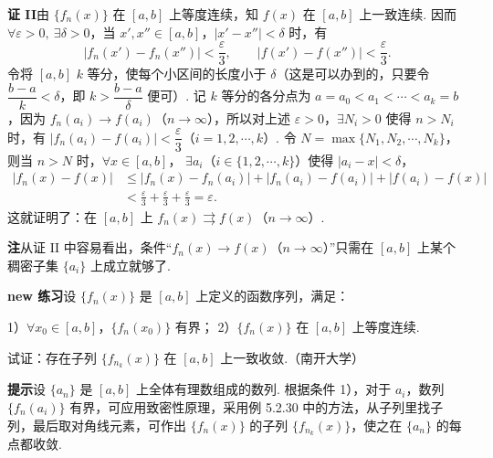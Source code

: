 \documentclass[UTF8, 12pt, fontset=fandol, oneside]{ctexart}
\begin{document}
\noindent\textbf{证 II}\quad 由 $\{f_n(x)\}$ 在 $[a,b]$ 上等度连续，知 $f(x)$ 在
$[a,b]$ 上一致连续. 因而 $\forall\varepsilon>0,\ \exists\delta>0$，当
$x',x''\in[a,b]$，$|x'-x''|<\delta$ 时，有
\[
  |f_n(x')-f_n(x'')|<\frac\varepsilon3,\qquad
  |f(x')-f(x'')|<\frac\varepsilon3.
\]
令将 $[a,b]$ $k$ 等分，使每个小区间的长度小于 $\delta$（这是可以办到的，只要令
$\dfrac{b-a}{k}<\delta$，即 $k>\dfrac{b-a}{\delta}$ 便可）. 记 $k$ 等分的各分点为
$a=a_0<a_1<\cdots<a_k=b$，因为 $f_n(a_i)\to f(a_i)$（$n\to\infty$），所以对上述
$\varepsilon>0$，$\exists N_i>0$ 使得 $n>N_i$ 时，有
$|f_n(a_i)-f(a_i)|<\dfrac\varepsilon3$（$i=1,2,\cdots,k$）. 令
$N=\max\{N_1,N_2,\cdots,N_k\}$，则当 $n>N$ 时，$\forall x\in[a,b]$，
$\exists a_i$（$i\in\{1,2,\cdots,k\}$）使得 $|a_i-x|<\delta$，
\[
\begin{aligned}
  |f_n(x)-f(x)|
  &\le |f_n(x)-f_n(a_i)|+|f_n(a_i)-f(a_i)|+|f(a_i)-f(x)|\\
  &<\frac\varepsilon3+\frac\varepsilon3+\frac\varepsilon3=\varepsilon.
\end{aligned}
\]
这就证明了：在 $[a,b]$ 上 $f_n(x)\rightrightarrows f(x)$（$n\to\infty$）.

\noindent\textbf{注}\quad 从证 II 中容易看出，条件“$f_n(x)\to f(x)$（$n\to\infty$）”只需在
$[a,b]$ 上某个稠密子集 $\{a_i\}$ 上成立就够了.

\noindent\textbf{new 练习}\quad 设 $\{f_n(x)\}$ 是 $[a,b]$ 上定义的函数序列，满足：

1）$\forall x_0\in[a,b]$，$\{f_n(x_0)\}$ 有界；
2）$\{f_n(x)\}$ 在 $[a,b]$ 上等度连续.

试证：存在子列 $\{f_{n_k}(x)\}$ 在 $[a,b]$ 上一致收敛.（南开大学）

\noindent\textbf{提示}\quad 设 $\{a_n\}$ 是 $[a,b]$ 上全体有理数组成的数列. 根据条件 1），对于
$a_i$，数列 $\{f_n(a_i)\}$ 有界，可应用致密性原理，采用例 5.2.30 中的方法，从子列里找子列，最后取对角线元素，可作出
$\{f_n(x)\}$ 的子列 $\{f_{n_k}(x)\}$，使之在 $\{a_n\}$ 的每点都收敛.
\end{document}
